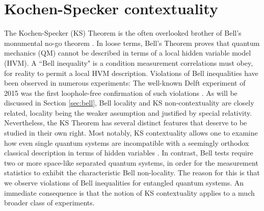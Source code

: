 \chapter{Kochen-Specker contextuality}
\label{sec:kscontextuality}
The Kochen-Specker (KS) Theorem \cite{Kochen1968} is the often overlooked brother of Bell's monumental no-go theorem \cite{Bell1964}. In loose terms, Bell's Theorem proves that quantum mechanics (QM) cannot be described in terms of a local hidden variable model (HVM). A ``Bell inequality" is a condition measurement correlations must obey, for reality to permit a local HVM description. Violations of Bell inequalities have been observed in numerous experiments: The well-known Delft experiment of 2015 was the first loophole-free confirmation of such violations \cite{Hensen2015}. As will be discussed in Section \ref{sec:bell}, Bell locality and KS non-contextuality are closely related, locality being the weaker assumption and justified by special relativity. Nevertheless, the KS Theorem has several distinct features that deserve to be studied in their own right. Most notably, KS contextuality allows one to examine how even single quantum systems are incompatible with a seemingly orthodox classical description in terms of hidden variables \cite{Pusey2019}. In contrast, Bell tests require two or more space-like separated quantum systems, in order for the measurement statistics to exhibit the characteristic Bell non-locality. The reason for this is that we observe violations of Bell inequalities for entangled quantum systems. An immediate consequence is that the notion of KS contextuality applies to a much broader class of experiments.

